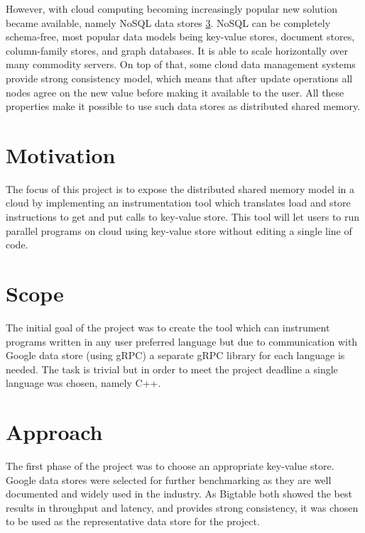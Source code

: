 \documentclass[bsc,frontabs,twoside,singlespacing,parskip,deptreport]{infthesis}     %
\begin{document}

However, with cloud computing becoming increasingly popular new solution became available, namely NoSQL data stores \ref{}. NoSQL can be completely schema-free, most popular data models being key-value stores, document stores, column-family stores, and graph databases. It is able to scale horizontally over many commodity servers. On top of that, some cloud data management systems provide strong consistency model, which means that after update operations all nodes agree on the new value before making it available to the user. All these properties make it possible to use such data stores as distributed shared memory.



\section{Motivation}

The focus of this project is to expose the distributed shared memory model in a cloud by implementing an instrumentation tool which translates load and store instructions to get and put calls to key-value store. This tool will let users to run parallel programs on cloud using key-value store without editing a single line of code.


\section{Scope}

The initial goal of the project was to create the tool which can instrument programs written in any user preferred language but due to communication with Google data store (using gRPC) a separate gRPC library for each language is needed. The task is trivial but in order to meet the project deadline a single language was chosen, namely C++. %


\section{Approach}

The first phase of the project was to choose an appropriate key-value store. Google data stores were selected for further benchmarking as they are well documented and widely used in the industry. As Bigtable both showed the best results in throughput and latency, and provides strong consistency, it was chosen to be used as the representative data store for the project. 
\end{document}

